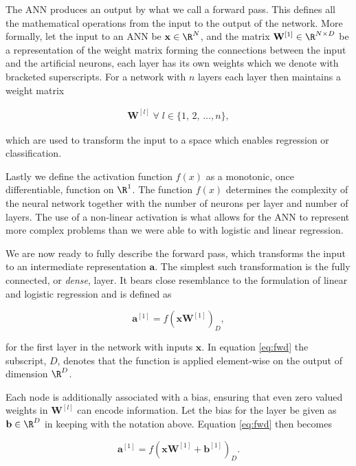 \noindent The ANN produces an output by what we call a forward pass. This defines all the mathematical operations from the input to the output of the network. More formally, let the input to an ANN be $\mathbf{x} \in \R^N$, and the matrix $\mathbf{W}^{[1]} \in \R^{N \times D}$ be a representation of the weight matrix forming the connections between the input and the artificial neurons, each layer has its own weights which we denote with bracketed superscripts. For a network with $n$ layers each layer then maintains a weight matrix 

\begin{align}
\mathbf{W}^{[l]} \; \forall \; l \in \{1,\, 2,\, \dots, n\},
\end{align}

\noindent which are used to transform the input to a space which enables regression or classification.  

Lastly we define the activation function $f(x)$ as a monotonic, once differentiable, function on $\R^1$. The function $f(x)$ determines the complexity of the neural network together with the number of neurons per layer and number of layers. The use of a non-linear activation is what allows for the ANN to represent more complex problems than we were able to with logistic and linear regression.

We are now ready to fully describe the forward pass, which transforms the input to an intermediate representation $\mathbf{a}$. The simplest such transformation is the fully connected, or \textit{dense}, layer. It bears close resemblance to the formulation of linear and logistic regression and is defined as 

\begin{equation}\label{eq:fwd}
	\mathbf{a}^{[1]} = f(\mathbf{x}\mathbf{W}^{[1]})_D,
\end{equation}

\noindent for the first layer in the network with inputs $\mathbf{x}$. In equation \ref{eq:fwd} the subscript, $D$, denotes that the function is applied element-wise on the output of dimension $\R^D$. 

Each node is additionally associated with a bias, ensuring that even zero valued weights in $\mathbf{W}^{[l]}$ can encode information. Let the bias for the layer be given as $\mathbf{b} \in \R^D$ in keeping with the notation above. Equation \ref{eq:fwd} then becomes

\begin{equation}\label{eq:fwd_b}
	\mathbf{a}^{[1]} = f(\mathbf{x}\mathbf{W}^{[1]} + \mathbf{b}^{[1]})_D.
\end{equation}

